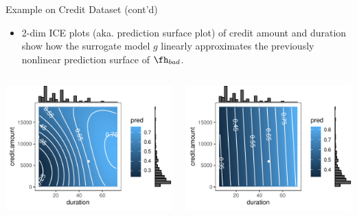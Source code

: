 \documentclass[11pt,compress,t,notes=noshow, aspectratio=169, xcolor=table]{beamer}
\newcommand{\pih}{\fh}
\begin{document}
\begin{frame}[c]{Example on Credit Dataset (cont'd)}

\begin{itemize}	
	\item 2-dim ICE plots (aka. prediction surface plot) of credit amount and duration show how the surrogate model $g$ linearly approximates the previously nonlinear prediction surface of $\pih_{bad}$. 
\end{itemize}
\vspace{-0.4cm}
 \begin{columns}
	\begin{column}{0.47\textwidth}
		\begin{center}
		\includegraphics[width=1\textwidth]{figure/lime_credit_ice1.pdf}
		\end{center}		
	\end{column}
	\begin{column}{0.46\textwidth}  
		\begin{center}
				\includegraphics[width=1\textwidth]{figure/lime_credit_ice2.pdf}
		\end{center}
			

\end{column}
\end{columns}
\end{frame}
\end{document}
